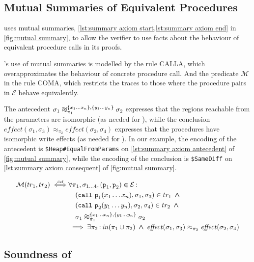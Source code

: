 \documentclass[runningheads,a4paper]{llncs}
\DeclareMathOperator{\band}{\bm{\;\land\;}}
\DeclareMathOperator{\suchthat}{:}
\newcommand*{\qvars}[2]{#1_{#2}}
\newcommand*{\defiff}{\stackrel{\text{\tiny def}}{\iff}}
\newcommand{\tr}{tr}
\newcommand*\iso{\approx}
\newcommand*{\equivmap}{\mathcal{E}}
\newcommand*{\callRuleAbstract}{\textnormal{CALLA}}
\newcommand*{\composeRuleAbstract}{\textnormal{COMA}}
\newcommand{\diff}{\mathit{effect}}
\newcommand*{\call}{\mathtt{call}}
\newcommand*{\fun}{\texttt{p}}
\newcommand*{\bijection}[1]{\mathit{in}{\left(#1\right)}}
\newcommand*{\wiso}{%
  \mathrel{\vcenter{\offinterlineskip
  \hbox{$\sim$}\vskip-.35ex\hbox{$\sim$}\vskip-.35ex\hbox{$\sim$}}}}
\newcommand*{\mutR}{\mathcal{M}}
\newcommand*{\store}{\sigma}
\begin{document}
\subsection{Mutual Summaries of Equivalent Procedures}

\tool{} uses mutual summaries, \cref{lst:summary axiom start,lst:summary axiom end} in \cref{fig:mutual summary}, to allow the verifier to use facts about the behaviour of equivalent procedure calls in its proofs. 

\tool{}'s use of mutual summaries is modelled by the rule \callRuleAbstract{}, which overapproximates the behaviour of concrete procedure call. And the predicate $\mutR$ in the rule \composeRuleAbstract{}, which restricts the traces to those where the procedure pairs in $\equivmap$ behave equivalently. 

The antecedent $\store_1 \wiso_{\pi_1}^{\{x_1 \ldots x_n\},\{y_1 \ldots y_n\}} \store_2$ expresses that the regions reachable from the parameters are isomorphic (as needed for \ctwo{}), while the conclusion $\diff(\store_1,\store_3) \iso_{\pi_2} \diff(\store_2,\store_4)$ expresses that the procedures have isomorphic write effects (as needed for \cthree{}). In our example, the encoding of the antecedent is \texttt{\$Heap\#EqualFromParams} on \cref{lst:summary axiom antecedent} of \cref{fig:mutual summary}, while the encoding of the conclusion is \texttt{\$SameDiff} on \cref{lst:summary axiom consequent} of \cref{fig:mutual summary}.

\begin{definition}\label{def:mutual summary}\setlength{\parindent}{0cm}
\[\begin{aligned}
\mutR(\tr_1,\tr_2) \defiff 
&\forall \pi_1,\qvars{\store}{1 \ldots 4},(\fun_1,\fun_2) \in \equivmap \suchthat \\
&\quad		(\call~\fun_1(x_1 \ldots x_n),\store_1,\store_3) \in \tr_1 \band \\
&\quad		(\call~\fun_2(y_1 \ldots y_n),\store_2,\store_4) \in \tr_2 \band \\
&\quad		\store_1 \wiso_{\pi_1}^{\{x_1 \ldots x_n\},\{y_1 \ldots y_n\}} \store_2 \\
&	\implies 
 	\exists \pi_2 \suchthat \bijection{\pi_1 \cup \pi_2} \band \diff(\store_1,\store_3) \iso_{\pi_2} \diff(\store_2,\store_4)
\end{aligned}\]
\end{definition}

\subsection{Soundness of \metho{}}
\end{document}
